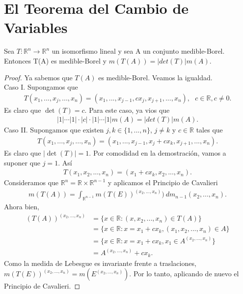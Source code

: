 \chapter{El Teorema del Cambio de Variables}

\begin{prop}
Sea $T: \mathbb{R}^n \longrightarrow \mathbb{R}^n$ un isomorfismo lineal y sea A un conjunto medible-Borel. Entonces T(A) es medible-Borel y $m(T(A)) = |det(T)|m(A)$.
\end{prop}

\begin{proof}
Ya sabemos que $T(A)$ es medible-Borel. Veamos la igualdad.
\\
\newline
Caso I. Supongamos que
\begin{align*}
    T(x_1,...,x_j,...,x_n) = (x_1,...,x_{j-1},cx_j,x_{j+1},...,x_n), \ \ \ c \in \mathbb{R}, c \not = 0.
\end{align*}
Es claro que $\det(T) = c$. Para este caso, ya vios que 
\begin{align*}
    |1| \cdots |1|\cdot |c| \cdot |1| \cdots |1|m(A) = |det(T)|m(A).
\end{align*}
Caso II. Supongamos que existen $j, k \in \{1,...,n\}$, $j \not = k$ y $c \in \mathbb{R}$ tales que
\begin{align*}
    T(x_1,...,x_j,...,x_n) = (x_1,...,x_{j-1},x_j +cx_k,x_{j+1},...,x_n).
\end{align*}
Es claro que $|\det(T)| = 1$. Por comodidad en la demostración, vamos a suponer que $j = 1$. Así
\begin{align*}
    T(x_1,x_2,...,x_n) = (x_1 +cx_k,x_2,...,x_n).
\end{align*}
Consideramos que $\mathbb{R}^n = \mathbb{R} \times \mathbb{R}^{n-1}$ y aplicamos el Principio de Cavalieri
\begin{align*}
    m(T(A)) = \int_{\mathbb{R}^{n-1}}{m(T(E))^{(x_2,...,x_n)}) \ dm_{n-1}(x_2,...,x_n)}.
\end{align*}
Ahora bien,
\begin{align*}
    (T(A))^{(x_2,...,x_n)} &= \{ x \in \mathbb{R} : (x,x_2,...,x_n) \in T(A) \} \\
    &= \{ x \in \mathbb{R} : x = x_1 + cx_k, (x_1,x_2,...,x_n) \in A \} \\
    &= \{x \in \mathbb{R} : x = x_1 + cx_k, x_1 \in A^{(x_2,...,x_n)} \} \\
    &= A^{(x_2,...,x_n)} + cx_k.
\end{align*}
Como la medida de Lebesgue es invariante frente a traslaciones, $m(T(E))^{(x_2,...,x_n)} = m(E^{(x_2,...,x_n)})$. Por lo tanto, aplicando de nuevo el Principio de Cavalieri.

\end{proof}
